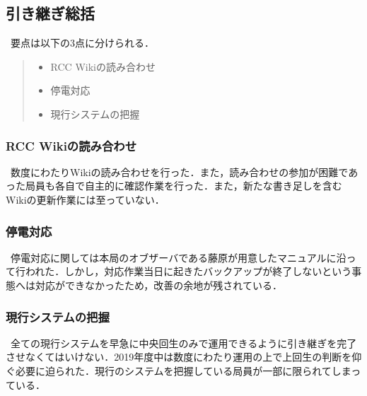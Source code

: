 \subsection*{引き継ぎ総括}


\ 要点は以下の3点に分けられる．
\begin{quote}
 \begin{itemize}
\item RCC Wikiの読み合わせ
\item 停電対応
\item 現行システムの把握
 \end{itemize}
\end{quote}
\subsubsection* {RCC Wikiの読み合わせ}
\ 数度にわたりWikiの読み合わせを行った．また，読み合わせの参加が困難であった局員も各自で自主的に確認作業を行った．また，新たな書き足しを含むWikiの更新作業には至っていない．
\subsubsection* {停電対応}
\ 停電対応に関しては本局のオブザーバである藤原が用意したマニュアルに沿って行われた．しかし，対応作業当日に起きたバックアップが終了しないという事態へは対応ができなかったため，改善の余地が残されている．
\subsubsection* {現行システムの把握}
\ 全ての現行システムを早急に中央回生のみで運用できるように引き継ぎを完了させなくてはいけない．2019年度中は数度にわたり運用の上で上回生の判断を仰ぐ必要に迫られた．現行のシステムを把握している局員が一部に限られてしまっている．


